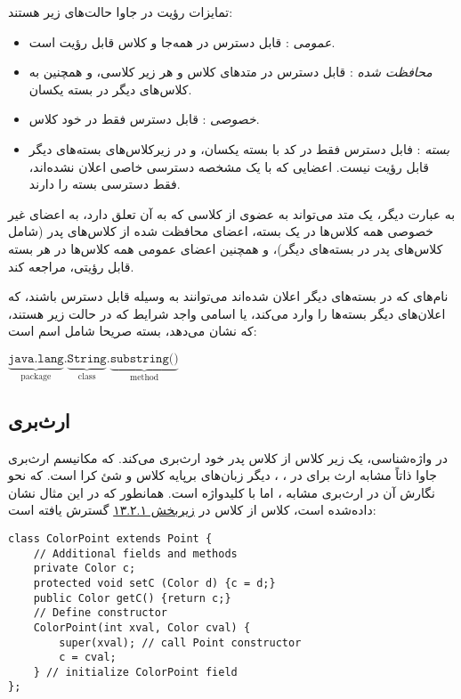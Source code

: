 \documentclass[a4paper,12pt]{report}
\newcommand{\lrInlineMono}[1]{{\color{steelBlue}\lr{\texttt{#1}}}}
\begin{document}
	تمایزات رؤیت
	 در جاوا حالت‌های زیر هستند:
\begin{itemize}[nosep]
	\renewcommand{\labelitemi}{\color{gray}\scriptsize$\blacksquare$}
	\item
	\textit{
	عمومی
}: قابل دسترس در همه‌جا و کلاس قابل رؤیت است.
	\item\textit{
	محافظت شده
}: قابل دسترس در متد‌های کلاس و هر زیر کلاسی، و همچنین به کلاس‌های دیگر در بسته یکسان. 
	\item\textit{
	خصوصی
}: قابل دسترس فقط در خود کلاس.
	\item\textit{
		بسته
}: فابل دسترس فقط در کد با بسته یکسان، و در زیرکلاس‌های بسته‌های دیگر قابل رؤیت نیست. اعضایی که با یک مشخصه دسترسی خاصی اعلان نشده‌اند، فقط دسترسی بسته را دارند.
\end{itemize}

	به عبارت دیگر، یک متد می‌تواند به عضوی از کلاسی که به آن تعلق دارد، به اعضای غیر خصوصی همه کلاس‌ها در یک بسته، اعضای محافظت شده از کلاس‌های پدر (شامل کلاس‌های پدر در بسته‌های دیگر)، و همچنین اعضای عمومی همه کلاس‌ها در هر بسته قابل رؤیتی، مراجعه کند.
	
	نام‌های که در بسته‌های دیگر اعلان شده‌اند می‌توانند به وسیله 
	\lrInlineMono{import}
	قابل دسترس باشند، که اعلان‌های دیگر بسته‌ها را وارد می‌کند، یا اسامی واجد شرایط که در حالت زیر هستند، که  نشان می‌دهد، بسته صریحا شامل اسم است:  


\begin{latin}
	\color{steelBlue}
	$\underbrace{\texttt{java.lang}}_{\text{package}}.
	\underbrace{\texttt{String}}_{\text{class}}.
	\underbrace{\texttt{substring()}}_{\text{method}}$
\end{latin}

\subsection{
	ارث‌بری}
\label{subsec3:sec2:chap13}
	در واژه‌شناسی، یک زیر کلاس از کلاس پدر خود ارث‌بری می‌کند. که مکانیسم ارث‌بری جاوا ذاتاً مشابه ارث برای در 
	، 
	، دیگر زبان‌های برپایه کلاس و شئ کرا است. که نحو نگارش آن در ارث‌بری مشابه 
	، اما با کلیدواژه 
	\lrInlineMono{extends}
	است. همانطور که در این مثال نشان داده‌شده است، کلاس 
	\lrInlineMono{ColorPoint}
	از کلاس 
	\lrInlineMono{Point}
	در 
	\hyperref[subsec1:sec2:chap13]{
	زیربخش ۱۳.۲.۱} گسترش یافته است:

\begin{latin}
	\small
	\begin{lstlisting}[]
class ColorPoint extends Point {
	// Additional fields and methods
	private Color c;
	protected void setC (Color d) {c = d;}
	public Color getC() {return c;}
	// Define constructor
	ColorPoint(int xval, Color cval) {
		super(xval); // call Point constructor
		c = cval; 
	} // initialize ColorPoint field
};
		\end{lstlisting}
\end{latin}	
\end{document}
